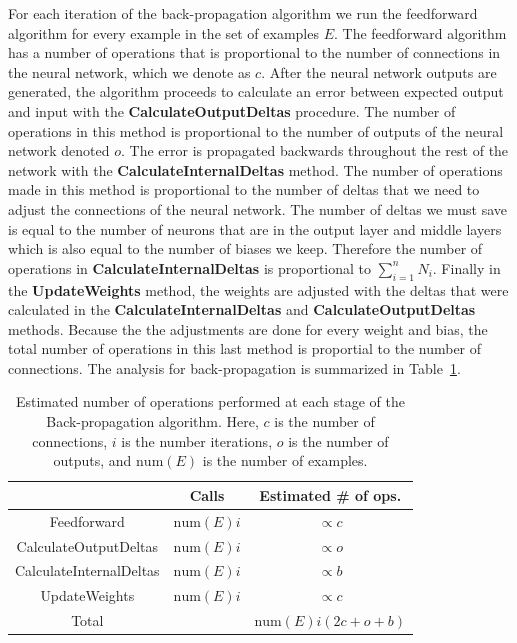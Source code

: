 \documentclass[11pt]{article}
\begin{document}
For each iteration of the back-propagation algorithm we run the feedforward algorithm for every example in the set of examples $E$. The
feedforward algorithm has a number of operations that is proportional to the number of connections in the neural network, which we
denote as $c$. After the neural network outputs are generated, the algorithm proceeds to calculate an error between expected output and
input with the \textbf{CalculateOutputDeltas} procedure. The number of operations in this method is proportional to the number of
outputs of the neural network denoted $o$. The error is propagated backwards throughout the rest of the network with the
\textbf{CalculateInternalDeltas} method. The number of operations made in this method is proportional to the number of deltas that we
need to adjust the connections of the neural network. The number of deltas we must save is equal to the number of neurons that are in
the output layer and middle layers which is also equal to the number of biases we keep. Therefore the number of operations in
\textbf{CalculateInternalDeltas} is proportional to $\sum_{i=1}^{n}N_{i}$. Finally in the \textbf{UpdateWeights} method, the weights are
adjusted with the deltas that were calculated in the \textbf{CalculateInternalDeltas} and \textbf{CalculateOutputDeltas} methods.
Because the the adjustments are done for every weight and bias, the total number of operations in this last method is proportial to the
number of connections. The analysis for back-propagation is summarized in Table~\ref{tab:backpropagation}.

\begin{table} 
	\label{tab:backpropagation}
	\begin{center}
		\begin{tabular}{ccc}
		\hline
		& Calls & Estimated \# of ops.\\
		\hline
		Feedforward & $\mbox{num}(E)i$ & $\propto c$\\
		CalculateOutputDeltas & $\mbox{num}(E)i$ & $\propto o$\\
		CalculateInternalDeltas & $\mbox{num}(E)i$ & $\propto b$\\
		UpdateWeights & $\mbox{num}(E)i$ & $\propto c$\\
		\hline
		Total & & $\mbox{num}(E)i(2c+o+b)$\\
		\hline
		\end{tabular}
		\caption{Estimated number of operations performed at each stage of the Back-propagation algorithm. Here, $c$ is the number of connections, $i$ is the number iterations, $o$ is the number of outputs, and $\mbox{num}(E)$ is the number of examples.}
	\end{center}
\end{table}
\end{document}
